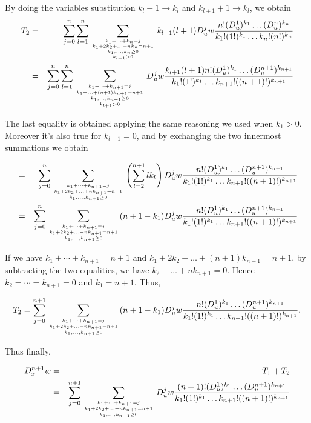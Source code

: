 \documentclass[a4paper,12pt]{article}
\newcommand{\ra}{\rightarrow}
\begin{document}
By doing the variables substitution $k_l - 1 \ra k_l$ and $k_{l+1} + 1
\ra k_l$, we obtain
\begin{eqnarray*}
  T_2 &=& \sum_{j=0}^n \sum_{l=1}^n \sum_{k_1+\cdots+k_n = j \atop {
      k_1 + 2k_2 + \ldots + n k_n = n+1 \atop {
        k_1, \ldots, k_n \ge 0 \atop k_{l+1} > 0}}} k_{l+1}(l+1) D_u^j
  w \frac{n!(D_u^1)^{k_1} \ldots (D_u^n)^{k_n}}{k_1!(1!)^{k_1} \ldots
    k_n!(n!)^{k_n}} \\
  &=& \sum_{j=0}^n \sum_{l=1}^n \sum_{k_1+\cdots+k_{n+1} = j \atop {
      k_1 + \ldots + (n+1) k_{n+1} = n+1 \atop {
        k_1, \ldots, k_{n+1} \ge 0 \atop k_{l+1} > 0}}} D_u^j
  w \frac{k_{l+1}(l+1) n!(D_u^1)^{k_1} \ldots
    (D_u^{n+1})^{k_{n+1}}}{k_1!(1!)^{k_1} \ldots k_{n+1}!((n+1)!)^{k_{n+1}}} \\
\end{eqnarray*}

The last equality is obtained applying the same reasoning we used when
$k_1 > 0$.  Moreover it's also true for $k_{l+1} = 0$, and by
exchanging the two innermost summations we obtain

\begin{eqnarray*}
  &=& \sum_{j=0}^n \sum_{k_1+\cdots+k_{n+1} = j \atop {
      k_1 + 2k_2 + \ldots + n k_{n+1} = n+1 \atop {
        k_1, \ldots, k_{n+1} \ge 0}}} \left(\sum_{l=2}^{n+1}lk_l\right) D_u^j
  w \frac{n!(D_u^1)^{k_1} \ldots (D_u^{n+1})^{k_{n+1}}}{k_1!(1!)^{k_1} \ldots
    k_{n+1}!((n+1)!)^{k_{n+1}}} \\
  &=& \sum_{j=0}^n \sum_{k_1+\cdots+k_{n+1} = j \atop {
      k_1 + 2k_2 + \ldots + n k_{n+1} = n+1 \atop {
        k_1, \ldots, k_{n+1} \ge 0}}} (n+1-k_1) D_u^j
  w \frac{n!(D_u^1)^{k_1} \ldots (D_u^{n+1})^{k_{n+1}}}{k_1!(1!)^{k_1} \ldots
    k_{n+1}!((n+1)!)^{k_{n+1}}} \\
\end{eqnarray*}

If we have $k_1+\cdots+k_{n+1} = n+1$ and $k_1 + 2k_2 + \ldots + (n+1)
k_{n+1} = n+1$, by subtracting the two equalities, we have $k_2 +
\ldots + nk_{n+1} = 0$.  Hence $k_2 = \cdots = k_{n+1} = 0$ and $k_1 =
n+1$.  Thus,

\[ T_2 = \sum_{j=0}^{n+1} \sum_{k_1+\cdots+k_{n+1} = j \atop {
      k_1 + 2k_2 + \ldots + n k_{n+1} = n+1 \atop {
        k_1, \ldots, k_{n+1} \ge 0}}} (n+1-k_1) D_u^j
  w \frac{n!(D_u^1)^{k_1} \ldots (D_u^{n+1})^{k_{n+1}}}{k_1!(1!)^{k_1} \ldots
    k_{n+1}!((n+1)!)^{k_{n+1}}} .
  \]

Thus finally,

\begin{eqnarray*}
  D_x^{n+1}w &=& T_1 + T_2 \\
  &=& \sum_{j=0}^{n+1} \sum_{k_1+\cdots+k_{n+1} = j \atop {
      k_1 + 2k_2 + \ldots + n k_{n+1} = n+1 \atop {
        k_1, \ldots, k_{n+1} \ge 0}}} D_u^j
  w \frac{(n+1)!(D_u^1)^{k_1} \ldots (D_u^{n+1})^{k_{n+1}}}{k_1!(1!)^{k_1} \ldots
    k_{n+1}!((n+1)!)^{k_{n+1}}}
\end{eqnarray*}
\end{document}
